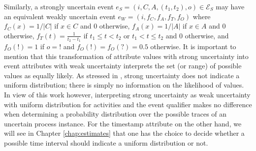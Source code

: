 Similarly, a strongly uncertain event $e_S=(i,C,A,(t_1,t_2),o) \in \mathcal{E}_S$ may have an equivalent weakly uncertain event $e_W=(i,f_C,f_A,f_T,f_O)$ where $f_C(x)=1/|C|$ if $x \in C$ and 0 otherwise, $f_A(x)=1/|A|$ if $x \in A$ and 0 otherwise, $f_T(t)=\frac{1}{t_2-t_1}$ if $t_1 \leq t < t_2$ or $t_1 < t \leq t_2$ and 0 otherwise, and $f_O(!)=1$ if $o=!$ and $f_O(!)=f_O(?)=0.5$ otherwise.
It is important to mention that this transformation of attribute values with strong uncertainty into event attributes with weak uncertainty interprets the set (or range) of possible values as equally likely.
As stressed in \cite{mining}, strong uncertainty does not indicate a uniform distribution; there is simply no information on the likelihood of values.
In view of this work however, interpreting strong uncertainty as weak uncertainty with uniform distribution for activities and the event qualifier makes no difference when determining a probability distribution over the possible traces of an uncertain process instance.
For the timestamp attribute on the other hand, we will see in Chapter \ref{chap:estimates} that one has the choice to decide whether a possible time interval should indicate a uniform distribution or not.


